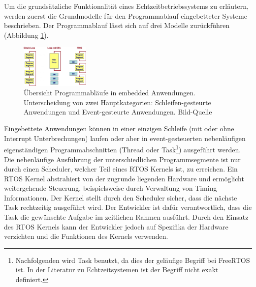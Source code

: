 Um die grund\-sätz\-liche Funktionalität eines Echtzeitbetriebssystems zu erläutern, werden zuerst die Grundmodelle für den Programmablauf eingebetteter Systeme beschrieben. Der Programmablauf lässt sich auf drei Modelle zu\-rück\-füh\-ren (Abbildung \ref{fig:Programmablauf}). 
\begin{figure}[ht]
	\centering
		\includegraphics[width=0.3\textwidth]{Pictures/EmbeddedCom/cwrtos2f5c.jpg}
	\caption{Übersicht Programmabläufe in embedded Anwendungen. Unterscheidung von zwei Hauptkategorien: Schleifen-gesteurte Anwendungen und Event-gesteurte Anwendungen. Bild-Quelle~\protect{}}
	\label{fig:Programmablauf}
\end{figure}
Eingebettete Anwendungen können in einer einzigen Schleife (mit oder ohne Interrupt Unterbrechungen) laufen oder aber in event-gesteuerten ne\-ben\-läuf\-igen ei\-gen\-stän\-dig\-en Pro\-gramm\-ab\-schnit\-ten (Thre\-ad oder Task\footnote{Nachfolgenden wird Task benutzt, da dies der geläufige Begriff bei FreeRTOS ist. In der Literatur zu Echtzeitsystemen ist der Begriff nicht exakt definiert.}) ausgeführt werden. Die ne\-ben\-läuf\-ige Aus\-füh\-rung der unterschiedlichen Programmsegmente ist nur durch einen Scheduler, welcher Teil eines RTOS Kernels ist, zu erreichen. Ein RTOS Kernel abstrahiert von der zugrunde liegenden Hardware und ermöglicht weitergehende Steuerung, beispielsweise durch Verwaltung von Timing Informationen. Der Kernel stellt durch den Scheduler sicher, dass die näch\-ste Task rechtzeitig ausgeführt wird. Der Entwickler ist dafür verantwortlich, dass die Task die ge\-wün\-schte Aufgabe im zeitlichen Rahmen ausführt. Durch den Einsatz des RTOS Kernels kann der Entwickler jedoch auf Spezifika der Hardware verzichten und die Funktionen des Kernels verwenden. 
